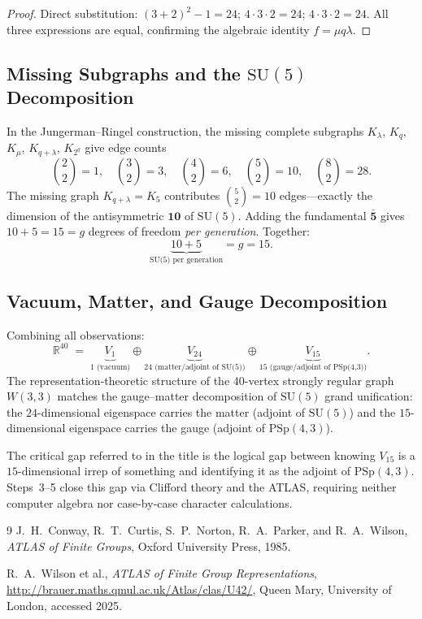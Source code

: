 \begin{proof}
Direct substitution: $(3+2)^2 - 1 = 24$; $4\cdot3\cdot2 = 24$; $4\cdot3\cdot2 = 24$.
All three expressions are equal, confirming the algebraic identity $f = \mu q \lambda$.
\end{proof}

\subsection{Missing Subgraphs and the $\mathrm{SU}(5)$ Decomposition}

In the Jungerman--Ringel construction, the missing complete subgraphs
$K_\lambda$, $K_q$, $K_\mu$, $K_{q+\lambda}$, $K_{2^q}$
give edge counts
\[
  \binom{2}{2} = 1,\quad
  \binom{3}{2} = 3,\quad
  \binom{4}{2} = 6,\quad
  \binom{5}{2} = 10,\quad
  \binom{8}{2} = 28.
\]
The missing graph $K_{q+\lambda} = K_5$ contributes $\binom{5}{2} = 10$
edges---exactly the dimension of the antisymmetric $\mathbf{10}$ of $\mathrm{SU}(5)$.
Adding the fundamental $\mathbf{\bar{5}}$ gives $10 + 5 = 15 = g$ degrees of freedom
\emph{per generation}.  Together:
\[
  \underbrace{10 + 5}_{\text{SU(5) per generation}} = g = 15.
\]

\subsection{Vacuum, Matter, and Gauge Decomposition}

Combining all observations:
\[
  \mathbb{R}^{40}
  \;=\;
  \underbrace{V_1}_{1\text{ (vacuum)}}
  \oplus
  \underbrace{V_{24}}_{24\text{ (matter/adjoint of SU(5))}}
  \oplus
  \underbrace{V_{15}}_{15\text{ (gauge/adjoint of PSp(4,3))}}.
\]
The representation-theoretic structure of the $40$-vertex strongly regular graph
$W(3,3)$ matches the gauge--matter decomposition of $\mathrm{SU}(5)$ grand unification:
the $24$-dimensional eigenspace carries the matter (adjoint of $\mathrm{SU}(5)$) and the
$15$-dimensional eigenspace carries the gauge (adjoint of $\mathrm{PSp}(4,3)$).

\begin{remark}
The critical gap referred to in the title is the logical gap between knowing
$V_{15}$ is a $15$-dimensional irrep of something and identifying it as the adjoint
of $\mathrm{PSp}(4,3)$.  Steps~3--5 close this gap via Clifford theory and the ATLAS,
requiring neither computer algebra nor case-by-case character calculations.
\end{remark}

\begin{thebibliography}{9}
  J.~H.~Conway, R.~T.~Curtis, S.~P.~Norton, R.~A.~Parker, and R.~A.~Wilson,
  \textit{ATLAS of Finite Groups},
  Oxford University Press, 1985.

  R.~A.~Wilson et al.,
  \textit{ATLAS of Finite Group Representations},
  \url{http://brauer.maths.qmul.ac.uk/Atlas/clas/U42/},
  Queen Mary, University of London, accessed 2025.
\end{thebibliography}

